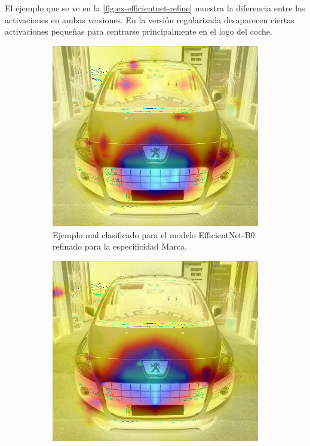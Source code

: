 El ejemplo que se ve en la \autoref{fig:ex-efficientnet-refine} muestra la
diferencia entre las activaciones en ambas versiones. En la versión regularizada
desaparecen ciertas activaciones pequeñas para centrarse principalmente en el logo
del coche.

\begin{figure}[H]
	\centering
	\begin{subfigure}
		{.45\textwidth}
		\centering
		\includegraphics[width=\linewidth]{img/192_false.png}
		\caption{Ejemplo mal clasificado para el modelo EfficientNet-B0 refinado
			para la especificidad Marca.}
		\label{fig:ex-efficientnet-refine-1}
	\end{subfigure}%
	\qquad
	\begin{subfigure}
		{.45\textwidth}
		\centering
		\includegraphics[width=\linewidth]{img/192_true.png}

\end{subfigure}
\end{figure}
